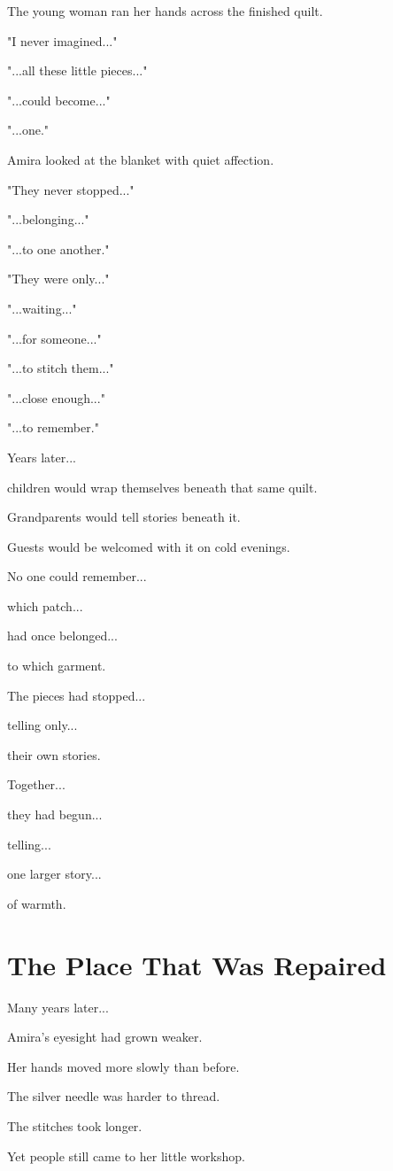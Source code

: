 \documentclass[12pt,openany]{book}
\begin{document}
The young woman ran her hands across the finished quilt.

"I never imagined..."

"...all these little pieces..."

"...could become..."

"...one."

Amira looked at the blanket with quiet affection.

"They never stopped..."

"...belonging..."

"...to one another."

"They were only..."

"...waiting..."

"...for someone..."

"...to stitch them..."

"...close enough..."

"...to remember."

Years later...

children would wrap themselves beneath that same quilt.

Grandparents would tell stories beneath it.

Guests would be welcomed with it on cold evenings.

No one could remember...

which patch...

had once belonged...

to which garment.

The pieces had stopped...

telling only...

their own stories.

Together...

they had begun...

telling...

one larger story...

of warmth.
\section*{The Place That Was Repaired}

Many years later...

Amira's eyesight had grown weaker.

Her hands moved more slowly than before.

The silver needle was harder to thread.

The stitches took longer.

Yet people still came to her little workshop.
\end{document}
